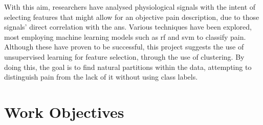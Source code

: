 With this aim, researchers have analysed physiological signals with the intent of selecting features that might allow for an objective pain description, due to those signals' direct correlation with the \ac{ans}. Various techniques have been explored, most employing machine learning models such as \ac{rf} and \ac{svm} to classify pain. Although these have proven to be successful, this project suggests the use of unsupervised learning for feature selection, through the use of clustering. By doing this, the goal is to find natural partitions within the data, attempting to distinguish pain from the lack of it without using class labels.




\section{Work Objectives}










